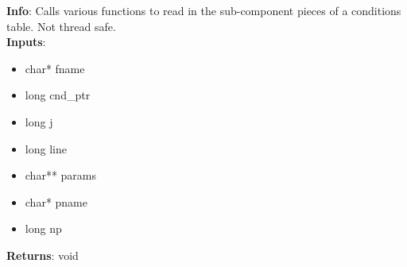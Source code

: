 \textbf{Info}: Calls various functions to read in the sub-component pieces of
a conditions table. Not thread safe. \\

\noindent \textbf{Inputs}:
\begin{itemize}
\item{char* fname}
\item{long cnd\_ptr}
\item{long j}
\item{long line}
\item{char** params}
\item{char* pname}
\item{long np}
\end{itemize}

\noindent \textbf{Returns}: void
